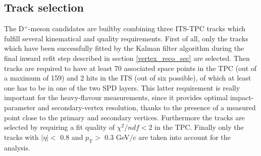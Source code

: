 \documentclass[b5paper,10pt,twoside,oldstyle,classica]{toptesi}
\newcommand{\pt}{p_\text{T}}
\begin{document}
\subsection{Track selection}
The D$^{+}$-meson candidates are builtby combining three ITS-TPC tracks which fulfill several kinematical and quality requirements. First of all, only the tracks which have been successfully fitted by the Kalman filter algorithm during the final inward refit step described in section \ref{vertex_reco_sec} are selected. Then tracks are required to have at least 70 associated space points in the TPC (out of a maximum of 159) and 2 hits in the ITS (out of six possible), of which at least one has to be in one of the two SPD layers. This latter requirement is really important for the heavy-flavour measurements, since it provides optimal impact-parameter and secondary-vertex resolution, thanks to the presence of a measured point close to the primary and secondary vertices. Furthermore the tracks are selected by requiring a fit quality of $\chi^{2}/ndf < 2$ in the TPC. Finally only the tracks with $|\eta| <$ 0.8 and $\pt >$ 0.3 GeV/c are taken into account for the analysis.
\end{document}
